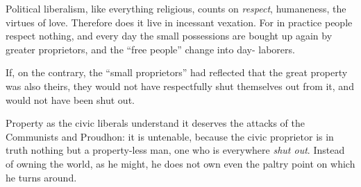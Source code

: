 \documentclass[12pt,a4paper]{book}
\begin{document}
Political liberalism, like everything religious, counts on \textit{respect}, 
humaneness, the virtues of love. Therefore does it live in incessant vexation. 
For in practice people respect nothing, and every day the small possessions 
are bought up again by greater proprietors, and the ``free people'' change 
into day- laborers.

If, on the contrary, the ``small proprietors'' had reflected that the great 
property was also theirs, they would not have respectfully shut themselves out 
from it, and would not have been shut out.

Property as the civic liberals understand it deserves the attacks of the 
Communists and Proudhon: it is untenable, because the civic proprietor is in 
truth nothing but a property-less man, one who is everywhere \textit{shut 
out}. Instead of owning the world, as he might, he does not own even the 
paltry point on which he turns around.
\end{document}
